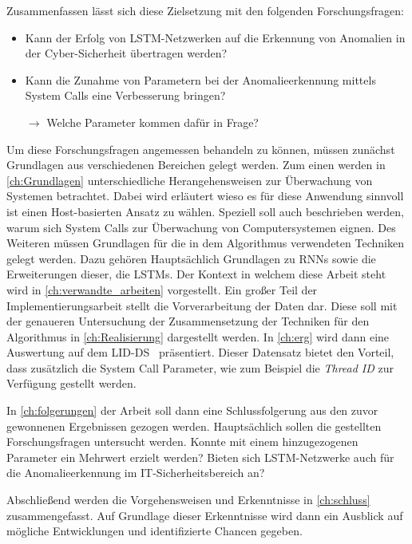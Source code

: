 Zusammenfassen lässt sich diese Zielsetzung mit den folgenden Forschungsfragen:
\begin{itemize}
    \item Kann der Erfolg von \ac{LSTM}-Netzwerken auf die Erkennung von Anomalien in der Cyber-Sicherheit übertragen werden?
    \item Kann die Zunahme von Parametern bei der Anomalieerkennung mittels System Calls eine Verbesserung bringen?

        $\rightarrow$ Welche Parameter kommen dafür in Frage?
\end{itemize}

Um diese Forschungsfragen angemessen behandeln zu können, müssen zunächst Grundlagen aus verschiedenen Bereichen gelegt werden.
Zum einen werden in \autoref{ch:Grundlagen} unterschiedliche Herangehensweisen zur Überwachung von Systemen betrachtet.
Dabei wird erläutert wieso es für diese Anwendung sinnvoll ist einen Host-basierten Ansatz zu wählen.
Speziell soll auch beschrieben werden, warum sich System Calls zur Überwachung von Computersystemen eignen.
Des Weiteren müssen Grundlagen für die in dem Algorithmus verwendeten Techniken gelegt werden.
Dazu gehören Hauptsächlich Grundlagen zu \acfp{RNN} sowie die Erweiterungen dieser, die \acp{LSTM}.
Der Kontext in welchem diese Arbeit steht wird in \autoref{ch:verwandte_arbeiten} vorgestellt.
Ein großer Teil der Implementierungsarbeit stellt die Vorverarbeitung der Daten dar.
Diese soll mit der genaueren Untersuchung der Zusammensetzung der Techniken für den Algorithmus in \autoref{ch:Realisierung} dargestellt werden.
In \autoref{ch:erg} wird dann eine Auswertung auf dem \acf{LID-DS}~\cite{LID-DS} präsentiert.
Dieser Datensatz bietet den Vorteil, dass zusätzlich die System Call Parameter, wie zum Beispiel die \textit{Thread ID} zur Verfügung gestellt werden.

In \autoref{ch:folgerungen} der Arbeit soll dann eine Schlussfolgerung aus den zuvor gewonnenen Ergebnissen gezogen werden. 
Hauptsächlich sollen die gestellten Forschungsfragen untersucht werden.
Konnte mit einem hinzugezogenen Parameter ein Mehrwert erzielt werden?
Bieten sich LSTM-Netzwerke auch für die Anomalieerkennung im IT-Sicherheitsbereich an?

Abschließend werden die Vorgehensweisen und Erkenntnisse in \autoref{ch:schluss} zusammengefasst.
Auf Grundlage dieser Erkenntnisse wird dann ein Ausblick auf mögliche Entwicklungen und identifizierte Chancen gegeben. 

